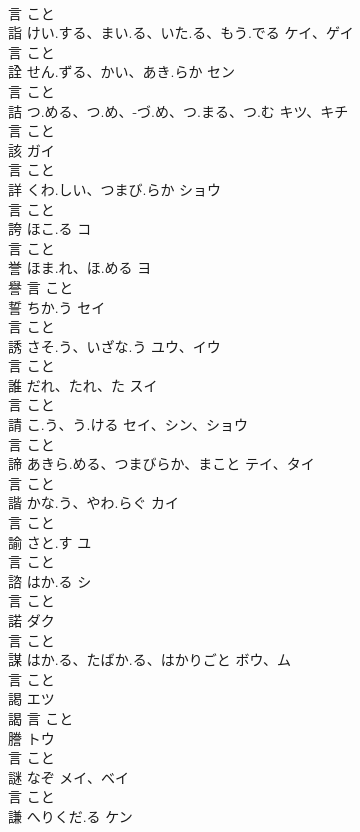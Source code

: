 \documentclass[8pt]{extreport}
\begin{document}
\begin{CJK}{UTF8}{min}
\\	言		こと		
\\	詣	けい.する、まい.る、いた.る、もう.でる	ケイ、ゲイ	
\\	言		こと		
\\	詮	せん.ずる、かい、あき.らか	セン	
\\	言		こと		
\\	詰	つ.める、つ.め、-づ.め、つ.まる、つ.む	キツ、キチ	
\\	言		こと		
\\	該		ガイ	
\\	言		こと		
\\	詳	くわ.しい、つまび.らか	ショウ	
\\	言		こと		
\\	誇	ほこ.る	コ	
\\	言		こと		
\\	誉	ほま.れ、ほ.める	ヨ	
\\	譽	言		こと		
\\	誓	ちか.う	セイ	
\\	言		こと		
\\	誘	さそ.う、いざな.う	ユウ、イウ	
\\	言		こと		
\\	誰	だれ、たれ、た	スイ	
\\	言		こと		
\\	請	こ.う、う.ける	セイ、シン、ショウ	
\\	言		こと		
\\	諦	あきら.める、つまびらか、まこと	テイ、タイ	
\\	言		こと		
\\	諧	かな.う、やわ.らぐ	カイ	
\\	言		こと		
\\	諭	さと.す	ユ	
\\	言		こと		
\\	諮	はか.る	シ	
\\	言		こと		
\\	諾		ダク	
\\	言		こと		
\\	謀	はか.る、たばか.る、はかりごと	ボウ、ム	
\\	言		こと		
\\	謁		エツ	
\\	謁	言		こと		
\\	謄		トウ	
\\	言		こと		
\\	謎	なぞ	メイ、ベイ	
\\	言		こと		
\\	謙	へりくだ.る	ケン	

\end{CJK}
\end{document}
